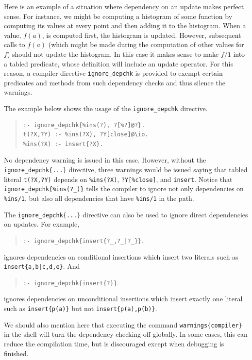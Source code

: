 \documentclass[11pt]{article}
\newcommand{\ERGO}{\mbox{\smaller{\ensuremath{\cal{E}}\smaller{{\sc{RGO}}}}}\xspace}
\newcommand{\FLSYSTEM}{\ERGO}
\begin{document}
\label{page-histogram}
Here is an example of a situation where
dependency on an update makes perfect
sense. For instance, we might be computing a histogram of some function
by computing its values at every point and then adding it to the
histogram. When a value, $f(a)$, is computed first, the histogram is
updated. However, subsequent calls to $f(a)$ (which might be made during
the computation of other values for $f$) should not update the histogram.
In this case it makes sense to make $f/1$ into a tabled predicate, whose
definition will include an update operator. For this reason, a compiler
directive {\tt ignore\_depchk} is provided to exempt certain predicates
and methods from such dependency checks and thus silence the warnings.

The example below shows the usage of the {\tt ignore\_depchk} directive.
\begin{quote}
\begin{verbatim}
:- ignore_depchk{%ins(?), ?[%?]@?}.
t(?X,?Y) :- %ins(?X), ?Y[close]@\io. 
%ins(?X) :- insert{?X}. 
\end{verbatim}
\end{quote}
No dependency warning is issued in this case. However, without the
{\tt ignore\_depchk\{...\}} directive, three warnings would be issued saying that
tabled literal {\tt t(?X,?Y)} depends on {\tt \%ins(?X)}, {\tt ?Y[\%close]},
and {\tt insert}. Notice that {\tt ignore\_depchk\{\%ins(?\_)\}} tells the
compiler to ignore not only dependencies on {\tt \%ins/1}, but also all
dependencies that have {\tt \%ins/1} in the path.

The {\tt ignore\_depchk\{...\}} directive can also be used to ignore direct
dependencies on updates. For example, 
\begin{quote}
{\tt :- ignore\_depchk\{insert\{?\_,?\_|?\_\}\}}.
\end{quote}
\noindent ignores dependencies on conditional insertions which insert
two literals such as {\tt insert\{a,b|c,d,e\}}. And
\begin{quote}
{\tt :- ignore\_depchk\{insert\{?\}\}}.
\end{quote}
\noindent ignores dependencies on unconditional insertions which insert
exactly one literal such as {\tt insert\{p(a)\}} but not {\tt insert\{p(a),p(b)\}}. 

We should also mention here that executing the command
\texttt{warnings\{compiler\}} in the \FLSYSTEM shell will turn the dependency
checking off globally. In some cases, this can 
reduce the compilation time, but is discouraged except when debugging is
finished.
\end{document}
